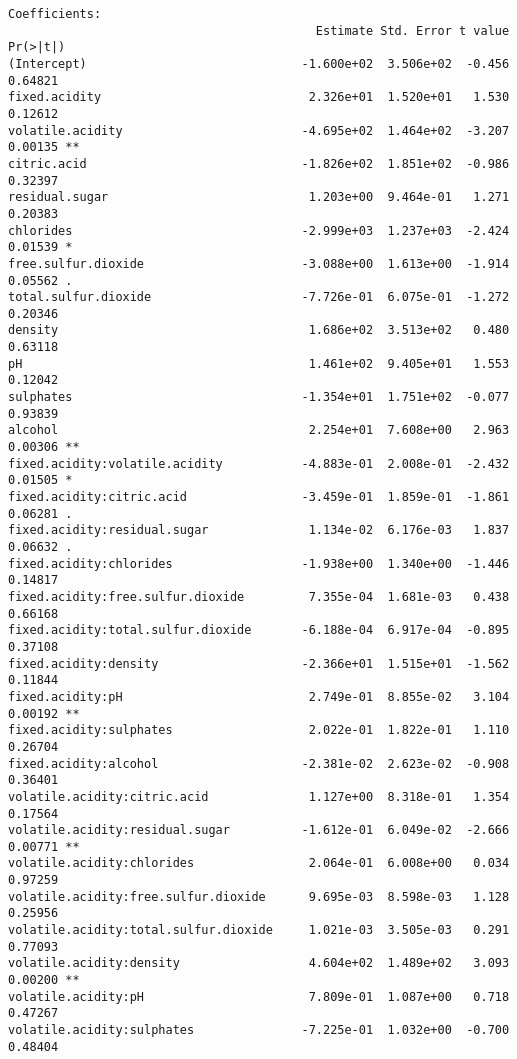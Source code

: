 \documentclass{jsarticle}
\begin{document}
\begin{verbatim}
Coefficients:
                                           Estimate Std. Error t value Pr(>|t|)    
(Intercept)                              -1.600e+02  3.506e+02  -0.456  0.64821    
fixed.acidity                             2.326e+01  1.520e+01   1.530  0.12612    
volatile.acidity                         -4.695e+02  1.464e+02  -3.207  0.00135 ** 
citric.acid                              -1.826e+02  1.851e+02  -0.986  0.32397    
residual.sugar                            1.203e+00  9.464e-01   1.271  0.20383    
chlorides                                -2.999e+03  1.237e+03  -2.424  0.01539 *  
free.sulfur.dioxide                      -3.088e+00  1.613e+00  -1.914  0.05562 .  
total.sulfur.dioxide                     -7.726e-01  6.075e-01  -1.272  0.20346    
density                                   1.686e+02  3.513e+02   0.480  0.63118    
pH                                        1.461e+02  9.405e+01   1.553  0.12042    
sulphates                                -1.354e+01  1.751e+02  -0.077  0.93839    
alcohol                                   2.254e+01  7.608e+00   2.963  0.00306 ** 
fixed.acidity:volatile.acidity           -4.883e-01  2.008e-01  -2.432  0.01505 *  
fixed.acidity:citric.acid                -3.459e-01  1.859e-01  -1.861  0.06281 .  
fixed.acidity:residual.sugar              1.134e-02  6.176e-03   1.837  0.06632 .  
fixed.acidity:chlorides                  -1.938e+00  1.340e+00  -1.446  0.14817    
fixed.acidity:free.sulfur.dioxide         7.355e-04  1.681e-03   0.438  0.66168    
fixed.acidity:total.sulfur.dioxide       -6.188e-04  6.917e-04  -0.895  0.37108    
fixed.acidity:density                    -2.366e+01  1.515e+01  -1.562  0.11844    
fixed.acidity:pH                          2.749e-01  8.855e-02   3.104  0.00192 ** 
fixed.acidity:sulphates                   2.022e-01  1.822e-01   1.110  0.26704    
fixed.acidity:alcohol                    -2.381e-02  2.623e-02  -0.908  0.36401    
volatile.acidity:citric.acid              1.127e+00  8.318e-01   1.354  0.17564    
volatile.acidity:residual.sugar          -1.612e-01  6.049e-02  -2.666  0.00771 ** 
volatile.acidity:chlorides                2.064e-01  6.008e+00   0.034  0.97259    
volatile.acidity:free.sulfur.dioxide      9.695e-03  8.598e-03   1.128  0.25956    
volatile.acidity:total.sulfur.dioxide     1.021e-03  3.505e-03   0.291  0.77093    
volatile.acidity:density                  4.604e+02  1.489e+02   3.093  0.00200 ** 
volatile.acidity:pH                       7.809e-01  1.087e+00   0.718  0.47267    
volatile.acidity:sulphates               -7.225e-01  1.032e+00  -0.700  0.48404    

\end{verbatim}
\end{document}
